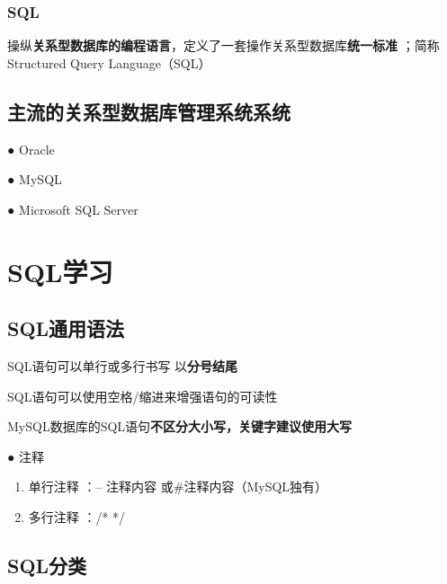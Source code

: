 \documentclass[
  letterpaper,
  DIV=11,
  numbers=noendperiod]{scrreprt}
\providecommand{\tightlist}{%
  \setlength{\itemsep}{0pt}\setlength{\parskip}{0pt}}\usepackage{longtable,booktabs,array}
\begin{document}
\hypertarget{sql}{%
\subsection{SQL}\label{sql}}

操纵\textbf{关系型数据库的编程语言}，定义了一套操作关系型数据库\textbf{统一标准}
；简称Structured Query Language（SQL）

\hypertarget{ux4e3bux6d41ux7684ux5173ux7cfbux578bux6570ux636eux5e93ux7ba1ux7406ux7cfbux7edfux7cfbux7edf}{%
\section{主流的关系型数据库管理系统系统}\label{ux4e3bux6d41ux7684ux5173ux7cfbux578bux6570ux636eux5e93ux7ba1ux7406ux7cfbux7edfux7cfbux7edf}}

● Oracle

● MySQL

● Microsoft SQL Server


\hypertarget{sqlux5b66ux4e60}{%
\chapter{SQL学习}\label{sqlux5b66ux4e60}}

\hypertarget{sqlux901aux7528ux8bedux6cd5}{%
\section{SQL通用语法}\label{sqlux901aux7528ux8bedux6cd5}}

SQL语句可以单行或多行书写 以\textbf{分号结尾}

SQL语句可以使用空格/缩进来增强语句的可读性

MySQL数据库的SQL语句\textbf{不区分大小写，关键字建议使用大写}

● 注释

\begin{enumerate}
\def\labelenumi{\arabic{enumi}.}
\tightlist
\item
  单行注释 ：-- 注释内容 或\#注释内容（MySQL独有）
\item
  多行注释 ：/* */
\end{enumerate}

\hypertarget{sqlux5206ux7c7b}{%
\section{SQL分类}\label{sqlux5206ux7c7b}}
\end{document}
